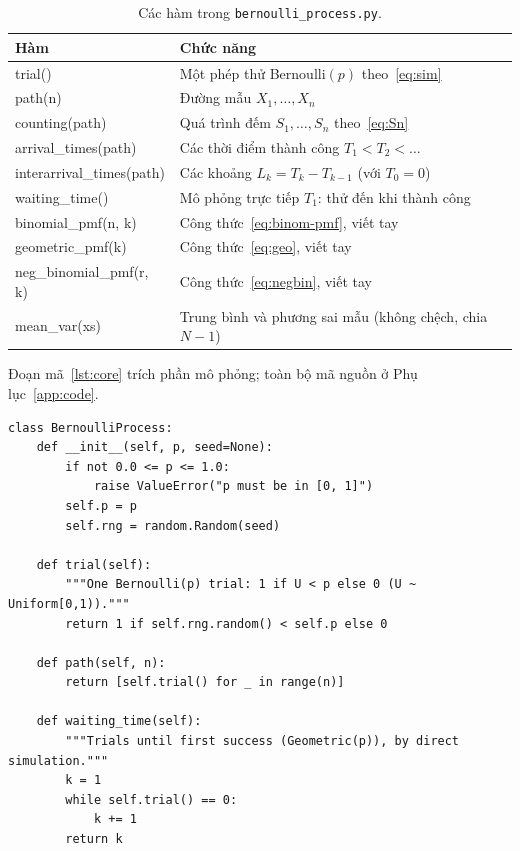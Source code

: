 \documentclass[12pt,a4paper]{article}
\theoremstyle{definition}
\theoremstyle{remark}
\begin{document}
\begin{table}[ht]
\centering
\caption{Các hàm trong \texttt{bernoulli\_process.py}.}
\label{tab:functions}
\small
\renewcommand{\arraystretch}{1.2}
\begin{tabularx}{\textwidth}{>{\ttfamily}l X}
\toprule
\normalfont\textbf{Hàm} & \textbf{Chức năng} \\
\midrule
trial() & Một phép thử Bernoulli$(p)$ theo~\eqref{eq:sim} \\
path(n) & Đường mẫu $X_1,\dots,X_n$ \\
counting(path) & Quá trình đếm $S_1,\dots,S_n$ theo~\eqref{eq:Sn} \\
arrival\_times(path) & Các thời điểm thành công $T_1 < T_2 < \dots$ \\
interarrival\_times(path) & Các khoảng $L_k = T_k - T_{k-1}$ (với $T_0=0$) \\
waiting\_time() & Mô phỏng trực tiếp $T_1$: thử đến khi thành công \\
binomial\_pmf(n, k) & Công thức~\eqref{eq:binom-pmf}, viết tay \\
geometric\_pmf(k) & Công thức~\eqref{eq:geo}, viết tay \\
neg\_binomial\_pmf(r, k) & Công thức~\eqref{eq:negbin}, viết tay \\
mean\_var(xs) & Trung bình và phương sai mẫu (không chệch, chia $N-1$) \\
\bottomrule
\end{tabularx}
\end{table}

Đoạn mã~\ref{lst:core} trích phần mô phỏng; toàn bộ mã nguồn ở Phụ lục~\ref{app:code}.

\begin{lstlisting}[caption={Phần mô phỏng của lớp \texttt{BernoulliProcess}.},label={lst:core}]
class BernoulliProcess:
    def __init__(self, p, seed=None):
        if not 0.0 <= p <= 1.0:
            raise ValueError("p must be in [0, 1]")
        self.p = p
        self.rng = random.Random(seed)

    def trial(self):
        """One Bernoulli(p) trial: 1 if U < p else 0 (U ~ Uniform[0,1))."""
        return 1 if self.rng.random() < self.p else 0

    def path(self, n):
        return [self.trial() for _ in range(n)]

    def waiting_time(self):
        """Trials until first success (Geometric(p)), by direct simulation."""
        k = 1
        while self.trial() == 0:
            k += 1
        return k
\end{lstlisting}
\end{document}
